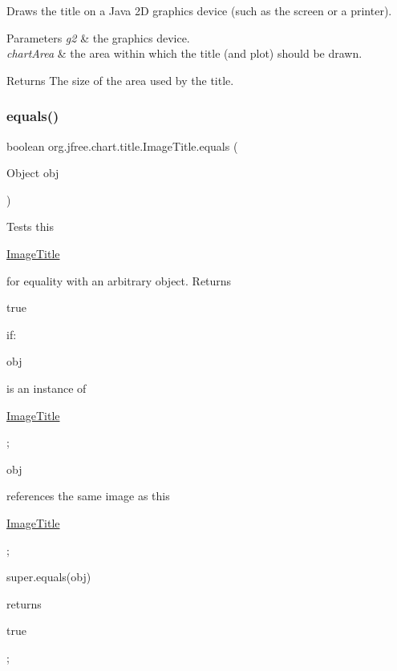 Draws the title on a Java 2D graphics device (such as the screen or a printer).


\begin{DoxyParams}{Parameters}
{\em g2} & the graphics device. \\
\hline
{\em chart\+Area} & the area within which the title (and plot) should be drawn.\\
\hline
\end{DoxyParams}
\begin{DoxyReturn}{Returns}
The size of the area used by the title. 
\end{DoxyReturn}
\mbox{\label{classorg_1_1jfree_1_1chart_1_1title_1_1_image_title_a37f9386a7a5f0cb24e36f39aa1211c2a}} 
\subsubsection{\texorpdfstring{equals()}{equals()}}
{\footnotesize\ttfamily boolean org.\+jfree.\+chart.\+title.\+Image\+Title.\+equals (\begin{DoxyParamCaption}\item[{Object}]{obj }\end{DoxyParamCaption})}

Tests this
\begin{DoxyCode}
\mbox{\hyperlink{classorg_1_1jfree_1_1chart_1_1title_1_1_image_title_a24e3d2cf74bb93acae77375d4b741351}{ImageTitle}} 
\end{DoxyCode}
 for equality with an arbitrary object. Returns
\begin{DoxyCode}
\textcolor{keyword}{true} 
\end{DoxyCode}
 if\+: 
\begin{DoxyItemize}
\item 
\begin{DoxyCode}
obj 
\end{DoxyCode}
 is an instance of
\begin{DoxyCode}
\mbox{\hyperlink{classorg_1_1jfree_1_1chart_1_1title_1_1_image_title_a24e3d2cf74bb93acae77375d4b741351}{ImageTitle}} 
\end{DoxyCode}
 ; 
\item 
\begin{DoxyCode}
obj 
\end{DoxyCode}
 references the same image as this 
\begin{DoxyCode}
\mbox{\hyperlink{classorg_1_1jfree_1_1chart_1_1title_1_1_image_title_a24e3d2cf74bb93acae77375d4b741351}{ImageTitle}} 
\end{DoxyCode}
 ; 
\item 
\begin{DoxyCode}
super.equals(obj) 
\end{DoxyCode}
 returns
\begin{DoxyCode}
\textcolor{keyword}{true} 
\end{DoxyCode}
 ; 
\end{DoxyItemize}


